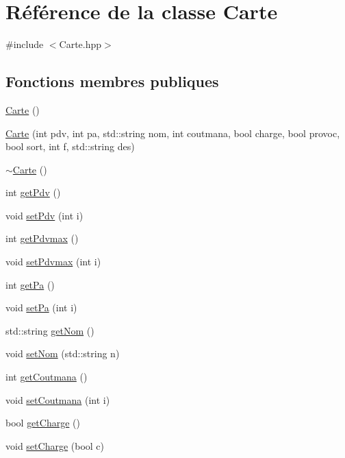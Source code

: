 \hypertarget{class_carte}{\section{\-Référence de la classe \-Carte}
\label{class_carte}
}


{\ttfamily \#include $<$\-Carte.\-hpp$>$}

\subsection*{\-Fonctions membres publiques}
\begin{DoxyCompactItemize}
\item 
\hyperlink{class_carte_a06daaca86c31c80f8308f4a81d46dc9b}{\-Carte} ()
\item 
\hyperlink{class_carte_aa9dbe7013e77d06af96ed4e4e0c4d551}{\-Carte} (int pdv, int pa, std\-::string nom, int coutmana, bool charge, bool provoc, bool sort, int f, std\-::string des)
\item 
\hyperlink{class_carte_a63300ff55c58b5d5b1674a3fc8f25910}{$\sim$\-Carte} ()
\item 
int \hyperlink{class_carte_a657918ef04b48d042985550cc9531b96}{get\-Pdv} ()
\item 
void \hyperlink{class_carte_a002eabf379874c8a989d0ee4469074d0}{set\-Pdv} (int i)
\item 
int \hyperlink{class_carte_a3d71e111f10666ca64f94c48ca2f215f}{get\-Pdvmax} ()
\item 
void \hyperlink{class_carte_aa997fa354a645b125491589dbc4631d1}{set\-Pdvmax} (int i)
\item 
int \hyperlink{class_carte_a581e595258304eb2ca44dbcf24fade5b}{get\-Pa} ()
\item 
void \hyperlink{class_carte_ab84e1045db524abd89c715ce8c9e57eb}{set\-Pa} (int i)
\item 
std\-::string \hyperlink{class_carte_a3650c2d0ea9877fe29f4673f430daa8e}{get\-Nom} ()
\item 
void \hyperlink{class_carte_a09ba2c6fba7ce1780e3bfa52f7adb13a}{set\-Nom} (std\-::string n)
\item 
int \hyperlink{class_carte_a7af45415441059ab3f3696d3ef711c6a}{get\-Coutmana} ()
\item 
void \hyperlink{class_carte_a7965f40ee312b74c9e65601156c8a1b9}{set\-Coutmana} (int i)
\item 
bool \hyperlink{class_carte_aba4e16959b49ba9c7673c6c3ac848da4}{get\-Charge} ()
\item 
void \hyperlink{class_carte_aa432c0b924d602dd602dbec76a2a05fd}{set\-Charge} (bool c)

\end{DoxyCompactItemize}
